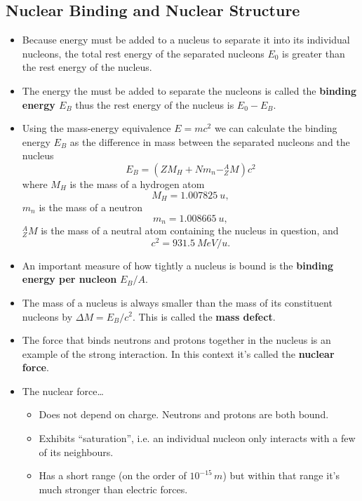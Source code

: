 \documentclass{article}
\begin{document}
\subsection{Nuclear Binding and Nuclear Structure}

\begin{itemize}
  \item Because energy must be added to a nucleus to separate it into its individual nucleons, the total rest energy of the separated nucleons $E_0$ is greater than the rest energy of the nucleus.

  \item The energy the must be added to separate the nucleons is called the \textbf{binding energy $E_B$} thus the rest energy of the nucleus is $E_0 - E_B$.

\item Using the mass-energy equivalence $E = m c^2$ we can calculate the binding energy $E_B$ as the difference in mass between the separated nucleons and the nucleus \[E_B = (Z M_H + N m_n - ^A_Z M) c^2\] where $M_H$ is the mass of a hydrogen atom \[M_H = \qty{1.007825}{u},\] $m_n$ is the mass of a neutron \[m_n = \qty{1.008665}{u},\] $^A_Z M$ is the mass of a neutral atom containing the nucleus in question, and \[c^2 = \qty{931.5}{MeV/u}.\]

  \item An important measure of how tightly a nucleus is bound is the \textbf{binding energy per nucleon} $E_B / A$.

  \item The mass of a nucleus is always smaller than the mass of its constituent nucleons by $\Delta M = E_B / c^2$. This is called the \textbf{mass defect}.

  \item The force that binds neutrons and protons together in the nucleus is an example of the strong interaction. In this context it's called the \textbf{nuclear force}.

  \item The nuclear force…

        \begin{itemize}
          \item Does not depend on charge. Neutrons and protons are both bound.

          \item Exhibits ``saturation'', i.e. an individual nucleon only interacts with a few of its neighbours.

          \item Has a short range (on the order of $10^{-15} \,\unit{m}$) but within that range it's much stronger than electric forces.


\end{itemize}
\end{itemize}
\end{document}
